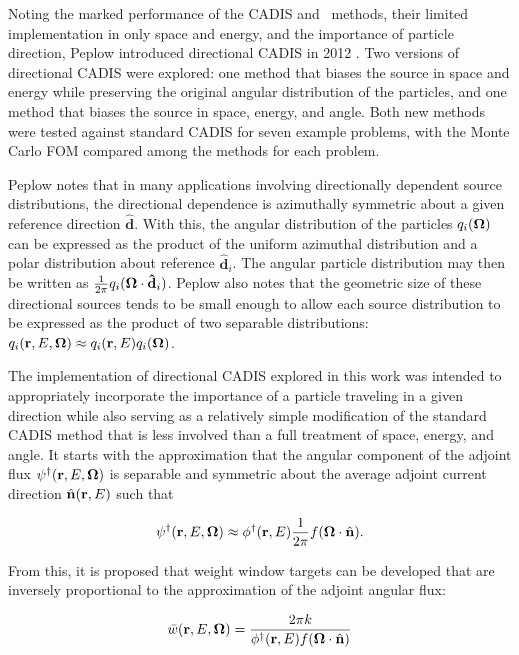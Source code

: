 Noting the marked performance of the CADIS and \fwc\ methods, their limited 
implementation in only space and energy, and the importance of particle direction, 
Peplow introduced directional CADIS in 2012 \cite{peplow}. Two versions of directional
CADIS were explored: one method that biases the source in space and energy while
preserving the original angular distribution of the particles, and one method that
biases the source in space, energy, and angle. Both new methods were tested against
standard CADIS for seven example problems, with the Monte Carlo FOM compared among the
methods for each problem.

Peplow notes that in many applications involving directionally dependent source 
distributions, the directional dependence is azimuthally symmetric about a given
reference direction $\mathbf{\hat{d}}$. With this, the angular distribution of the 
particles $q_i(\mathbf\Omega)$ can be expressed as the product of the uniform azimuthal 
distribution and a polar distribution about reference $\mathbf{\hat{d}}_i$. The 
angular particle distribution may then be written as 
$\frac{1}{2\pi}q_i(\mathbf\Omega\cdot\mathbf{\hat{d}}_i)$. Peplow also notes that the
geometric size of these directional sources tends to be small enough to allow each
source distribution to be expressed as the product of two separable distributions:
$q_i(\textbf{r},E,\mathbf\Omega) \approx q_i(\textbf{r}, E)q_i(\mathbf\Omega)$.

The implementation of directional CADIS explored in this work was intended to
appropriately incorporate the importance of a particle traveling in a given direction
while also serving as a relatively simple modification of the standard CADIS method
that is less involved than a full treatment of space, energy, and angle. It starts 
with the approximation that the angular component of the adjoint flux 
$\psi^{\dagger}(\textbf{r},E,\mathbf\Omega)$ is separable and symmetric about the average adjoint
current direction $\hat{\mathbf{n}}(\textbf{r},E)$ such that

\begin{equation}
\psi^{\dagger}(\textbf{r},E,\mathbf\Omega) \approx
\phi^{\dagger}(\textbf{r},E)\frac{1}{2\pi}f(\mathbf\Omega\cdot\hat{\mathbf{n}}).
\end{equation}

\noindent From this, it is proposed that weight window targets can be developed that
are inversely proportional to the approximation of the adjoint angular flux:

\begin{equation}
\bar{w}(\textbf{r},E,\mathbf\Omega) = 
\frac{2\pi k}{\phi^{\dagger}(\textbf{r},E)f(\mathbf\Omega\cdot\hat{\mathbf{n}})}
\end{equation}


